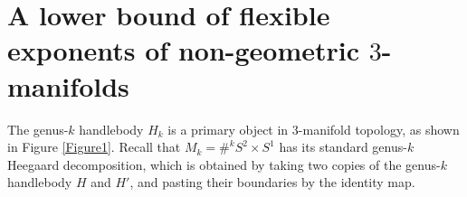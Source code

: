 \documentclass{amsart}
\newcommand{\lip}{\operatorname{Lip}}
\begin{document}
       
 
 
 
 
 
    
    
    
    

 
        



\section{A lower bound of flexible exponents of non-geometric $3$-manifolds}\label{finish}

The genus-$k$ handlebody $H_k$ is a primary object in 3-manifold topology, as shown in Figure \ref{Figure1}. 
Recall that $M_k=\#^k S^2\times S^1$ has its standard genus-$k$ Heegaard decomposition, which is obtained by taking two copies of the genus-$k$ handlebody $H$ and $H'$, and pasting their boundaries by the identity map.
\end{document}
